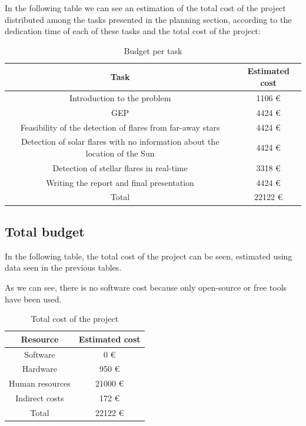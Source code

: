 In the following table we can see an estimation of the total cost of the project distributed among the tasks presented in the planning section, according to the dedication time of each of these tasks and the total cost of the project:

\begin{table}[h!]
	\centering
	\def\arraystretch{1.2}
	\begin{tabular}{|c c|} 
		\hline
		Task & Estimated cost\\
		\hline\hline
		Introduction to the problem & 1106 \euro\\
		\hline
		GEP & 4424 \euro\\
		\hline
		Feasibility of the detection of flares from far-away stars & 4424 \euro\\
		\hline
		Detection of solar flares with no information about the location of the Sun & 4424 \euro\\
		\hline
		Detection of stellar flares in real-time & 3318 \euro\\
		\hline
		Writing the report and final presentation & 4424 \euro\\
		\hline\hline
		Total & 22122 \euro\\
		\hline
	\end{tabular}
	\caption{Budget per task}
\end{table}

\newpage

\subsection{Total budget}

In the following table, the total cost of the project can be seen, estimated using data seen in the previous tables.

As we can see, there is no software cost because only open-source or free tools have been used.

\begin{table}[h!]
	\centering
	\def\arraystretch{1.2}
	\begin{tabular}{|c c|} 
		\hline
		Resource & Estimated cost\\
		\hline\hline
		Software & 0 \euro\\
		\hline
		Hardware & 950 \euro\\
		\hline
		Human resources & 21000 \euro\\
		\hline
		Indirect costs & 172 \euro\\
		\hline\hline
		Total & 22122 \euro\\
		\hline
	\end{tabular}
	\caption{Total cost of the project}
\end{table}

